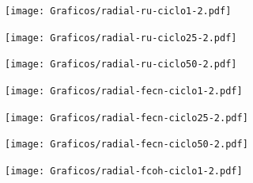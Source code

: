 		\begin{figure}[b!]
			   	    \begin{subfigure}[t]{0.325\textwidth}
			        	\texttt{[image: Graficos/radial-ru-ciclo1-2.pdf]}
			     		\end{subfigure}
			   	    \begin{subfigure}[t]{0.325\textwidth}
			        	\texttt{[image: Graficos/radial-ru-ciclo25-2.pdf]}
			     		\end{subfigure}
		     		\begin{subfigure}[t]{0.325\textwidth}
			        	\texttt{[image: Graficos/radial-ru-ciclo50-2.pdf]}
			     		\end{subfigure}
		     		\begin{subfigure}[t]{0.325\textwidth}
			        	\texttt{[image: Graficos/radial-fecn-ciclo1-2.pdf]}
			     		\end{subfigure}
		 	   	   	\begin{subfigure}[t]{0.325\textwidth}
			        	\texttt{[image: Graficos/radial-fecn-ciclo25-2.pdf]}
			     		\end{subfigure}
		     		\begin{subfigure}[t]{0.325\textwidth}
			        	\texttt{[image: Graficos/radial-fecn-ciclo50-2.pdf]}
			     		\end{subfigure}
			     	\begin{subfigure}[t]{0.325\textwidth}
			        	\texttt{[image: Graficos/radial-fcoh-ciclo1-2.pdf]}

\end{subfigure}
\end{figure}
